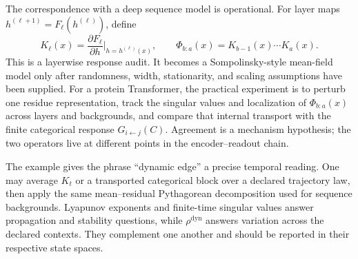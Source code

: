 The correspondence with a deep sequence model is operational.  For layer maps
$h^{(\ell+1)}=F_\ell(h^{(\ell)})$, define
\begin{equation}
K_\ell(x)=\frac{\partial F_\ell}{\partial h}
\bigg|_{h=h^{(\ell)}(x)},
\qquad
\Phi_{b:a}(x)=K_{b-1}(x)\cdots K_a(x).
\label{eq:book-layerwise-propagator}
\end{equation}
This is a layerwise response audit.  It becomes a Sompolinsky-style mean-field model only after
randomness, width, stationarity, and scaling assumptions have been supplied.  For a protein
Transformer, the practical experiment is to perturb one residue representation, track the
singular values and localization of $\Phi_{b:a}(x)$ across layers and backgrounds, and compare
that internal transport with the finite categorical response $G_{i\leftarrow j}(C)$.  Agreement is
a mechanism hypothesis; the two operators live at different points in the encoder--readout chain.

The example gives the phrase ``dynamic edge'' a precise temporal reading.  One may average
$K_t$ or a transported categorical block over a declared trajectory law, then apply the same
mean--residual Pythagorean decomposition used for sequence backgrounds.  Lyapunov exponents and
finite-time singular values answer propagation and stability questions, while
$\rho^{\mathrm{dyn}}$ answers variation across the declared contexts.  They complement one another
and should be reported in their respective state spaces.
